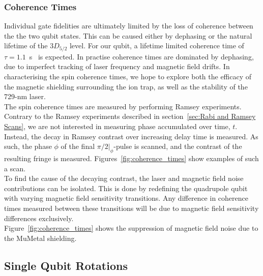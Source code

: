 \subsubsection{Coherence Times}
    Individual gate fidelities are ultimately limited by the loss of coherence
    between the the two qubit states. This can be caused either by dephasing or
    the natural lifetime of the $3D_{5/2}$ level. For our qubit, a lifetime limited coherence time of $\tau =
    1.1$~s~\cite{barton_measurement_2000} is expected. 
    In practise coherence times are dominated by dephasing, due to imperfect
    tracking of laser frequency and magnetic field drifts.  In characterising
    the spin coherence times, we hope to explore both the efficacy of the
    magnetic shielding surrounding the ion trap, as well as the stability of the
    729-nm laser. \\
    The spin coherence times are measured by performing Ramsey experiments.
    Contrary to the Ramsey experiments described in section~\ref{sec:Rabi and Ramsey
    Scans}, we are not interested in measuring phase accumulated over time, $t$.
    Instead, the decay in Ramsey contrast over increasing delay time is measured. As such, the phase $\phi$ of the final
    $\pi/2|_\phi$-pulse is scanned, and the contrast of the resulting fringe is measured.
    Figures~\ref{fig:coherence_times} show examples of such a scan. \\
    To find the cause of the decaying contrast, the laser and
    magnetic field noise contributions can be isolated. This is done by redefining the quadrupole qubit with
    varying magnetic field sensitivity transitions. Any difference in coherence
    times measured between these transitions will be due to magnetic field
    sensitivity differences exclusively. \\
    Figure~\ref{fig:coherence_times} shows the suppression of magnetic field noise due to the MuMetal shielding. \\


\subsection{Single Qubit Rotations}
\label{sec:Single Qubit Gates}

